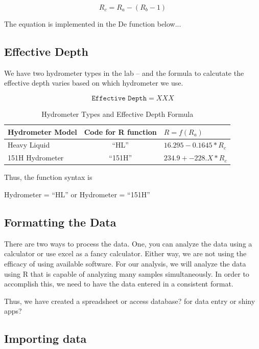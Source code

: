\documentclass{tufte-handout}
\begin{document}
\begin{equation}
R_c = R_a - (R_b - 1)
\end{equation}

The equation is implemented in the De function below...



\subsection{Effective Depth}

We have two hydrometer types in the lab -- and the formula to calcutate the effective depth varies based on which hydrometer we use. 

\begin{equation}
\texttt{Effective Depth} = XXX
\end{equation}

\begin{table}
		\begin{tabular}{lcl}\hline
Hydrometer Model	& Code for R function  	&	$R = f(R_a)$	\\ \hline\hline
Heavy Liquid			&		``HL''							&	$16.295 - 0.1645 * R_c$\\
151H Hydrometer		& 	``151H''						& $234.9 + -228.X * R_c$\\ \hline
		\end{tabular}
	\caption{Hydrometer Types and Effective Depth Formula}
	\label{tab:HydrometerTypesAndEffectiveDepthFormula}
\end{table}

Thus, the function syntax is

Hydrometer = ``HL'' or Hydrometer = ``151H''

\subsection{Formatting the Data}

There are two ways to process the data. One, you can analyze the data using a calculator or use excel as a fancy calculator. Either way, we are not using the efficacy of using available software. For our analysis, we will analyze the data using R that is capable of analyzing many samples simultaneously. In order to accomplish this, we need to have the data entered in a consistent format. 

Thus, we have created a spreadsheet or access database? for data entry or shiny apps?

\subsection{Importing data}
\end{document}
